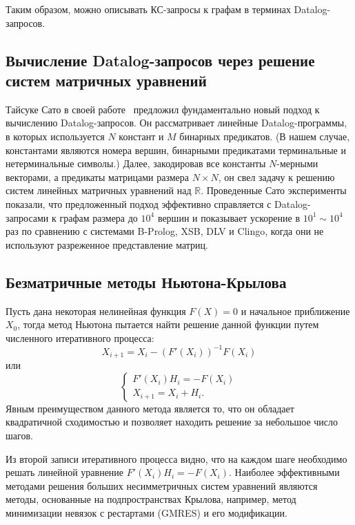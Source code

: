 \documentclass[12pt]{matmex-diploma-custom}
\begin{document}
Таким образом, можно описывать КС-запросы к графам в терминах Datalog-запросов.


\subsection{Вычисление Datalog-запросов через решение систем матричных уравнений}

Тайсуке Сато в своей работе~\cite{sato2017linear} предложил фундаментально новый подход к вычислению Datalog-запросов. 
Он рассматривает линейные Datalog-программы, в которых используется $N$ констант и $M$ бинарных предикатов. (В нашем случае, константами являются номера вершин, бинарными предикатами терминальные и нетерминальные символы.) Далее, закодировав все константы $N$-мерными векторами, а предикаты матрицами размера $N \times N$, он свел задачу к решению систем линейных матричных уравнений над $\mathbb{R}$.
Проведенные Сато эксперименты показали, что предложенный подход эффективно справляется с Datalog-запросами к графам размера до $10^4$ вершин и показывает ускорение в $10^1 \sim 10^4$ раз по сравнению с системами B-Prolog, XSB, DLV и Clingo, когда они не используют разреженное представление матриц. 

\subsection{Безматричные методы Ньютона-Крылова}

Пусть дана некоторая нелинейная функция $F(X) = 0$ и начальное приближение $X_0$, тогда метод Ньютона пытается найти решение данной функции путем численного итеративного процесса:
$$X_{i+1} = X_i - (F'(X_i))^{-1} F(X_i)$$ 
или
\begin{equation*}
  \begin{cases}
    F'(X_i) H_i = -F(X_i)\\
    X_{i+1} = X_i + H_i.
  \end{cases}
\end{equation*}
Явным преимуществом данного метода является то, что он обладает квадратичной сходимостью и позволяет находить решение за небольшое число шагов.

Из второй записи итеративного процесса видно, что на каждом шаге необходимо решать линейной уравнение $F'(X_i) H_i = -F(X_i)$. Наиболее эффективными методами решения больших несимметричных систем уравнений являются методы, основанные на подпространствах Крылова, например, метод минимизации невязок с рестартами (GMRES) и его модификации.
\end{document}
